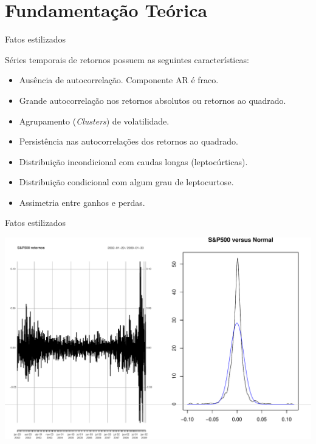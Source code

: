 \documentclass[ignorenonframetext,]{beamer}
\begin{document}
\section{Fundamentação Teórica}\label{fundamentacao-teorica}

\begin{frame}{Fatos estilizados}

Séries temporais de retornos possuem as seguintes características:

\begin{itemize}
\item
  Ausência de autocorrelação. Componente AR é fraco.
\item
  Grande autocorrelação nos retornos absolutos ou retornos ao quadrado.
\item
  Agrupamento (\emph{Clusters}) de volatilidade.
\item
  Persistência nas autocorrelações dos retornos ao quadrado.
\item
  Distribuição incondicional com caudas longas (leptocúrticas).
\item
  Distribuição condicional com algum grau de leptocurtose.
\item
  Assimetria entre ganhos e perdas.
\end{itemize}

\end{frame}

\begin{frame}{Fatos estilizados}

\includegraphics{artigo-apresentacao_files/figure-beamer/sp500ret-1.pdf}

\end{frame}
\end{document}
